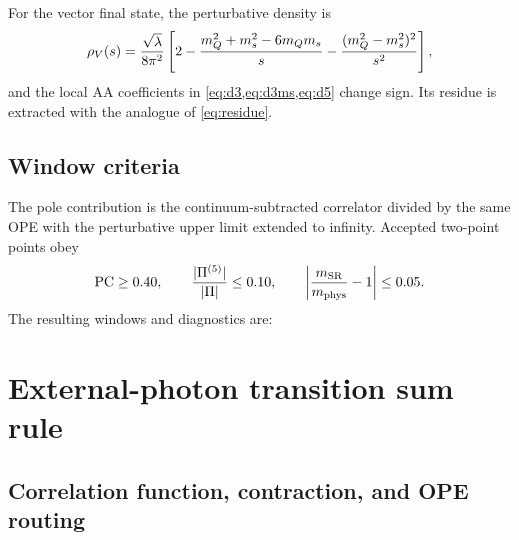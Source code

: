 \documentclass[11pt,a4paper]{article}
\begin{document}
For the vector final state, the perturbative density is
\begin{equation}
\rho_V(s)={\sqrt{\lambda}\over8\pi^2}
\left[2-{m_Q^2+m_s^2-6m_Qm_s\over s}
-{(m_Q^2-m_s^2)^2\over s^2}\right],
\end{equation}
and the local AA coefficients in
\cref{eq:d3,eq:d3ms,eq:d5} change sign.  Its residue is extracted with the
analogue of \cref{eq:residue}.

\subsection{Window criteria}

The pole contribution is the continuum-subtracted correlator divided by the
same OPE with the perturbative upper limit extended to infinity.  Accepted
two-point points obey
\begin{equation}
\mathrm{PC}\ge0.40,\qquad
{|\Pi^{(5)}|\over|\Pi|}\le0.10,\qquad
\left|{m_{\rm SR}\over m_{\rm phys}}-1\right|\le0.05.
\end{equation}
The resulting windows and diagnostics are:
\begin{table}[H]
\centering\small

\caption{Accepted two-point windows.  The predicted lower bottom mass used
for the residue extraction is \SI{5.75}{GeV}.}
\label{tab:windows}
\end{table}

\section{External-photon transition sum rule}

\subsection{Correlation function, contraction, and OPE routing}
\end{document}
